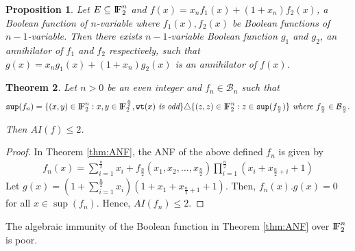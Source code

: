 \documentclass{article}[12pt]
\newtheorem{theorem}{Theorem}[section]
\newtheorem{proposition}[theorem]{Proposition}
\newcommand{\FF}{{\rm I\!F}}
\newcommand{\CB}{\mathcal{B}}
\newcommand{\wt}{\mathtt{wt}}
\newcommand{\spt}{\mathtt{sup}}
\begin{document}
\begin{proposition} 
	Let $E \subseteq \FF_2^n$ and  $f(x)= x_n f_1(x) +(1+x_n)f_2(x)$, a Boolean function of $n$-variable where $f_1 (x), f_2 (x)$ be Boolean functions of $n-1$-variable. Then there exists $n-1$-variable Boolean function $g_1$ and $g_2$, an annihilator of $f_1$ and $f_2$ respectively, such that $g(x)= x_n g_1(x) + (1+x_n) g_2 (x) $ is an annihilator of $f(x)$. 
\end{proposition}

\begin{theorem}
Let $n> 0$ be an even integer and $f_n \in  \CB_n$ such that
$$\spt(f_n) = \{(x,y) \in \FF_2^n : x,y \in \FF_2^{\frac{n}{2}}, \wt(x) \textit{ is odd}\} \triangle \{(z,z) \in \FF_2^n : z \in \spt(f_{\frac{n}{2}})\} \textit{ where } f_{\frac{n}{2}} \in \CB_{\frac{n}{2}}.$$

Then $AI(f) \leq 2$.
\end{theorem}
\begin{proof}
	In Theorem \ref{thm:ANF}, the ANF of the above defined $f_n$ is given by 
    \begin{align*}
    		\displaystyle{f_n(x)= \sum_{i=1}^{\frac{n}{2}} x_{i} + f_{\frac{n}{2}}(x_1,x_2,\ldots,x_\frac{n}{2})\prod_{i=1}^{\frac{n}{2}} (x_i + x_{\frac{n}{2} + i} + 1) } 
    \end{align*}	
Let $g(x)= (1+ \sum_{i=1}^{\frac{n}{2}} x_{i}) (1+ x_1 + x_{\frac{n}{2}+1} + 1)$. Then, $f_n(x).g(x)= 0 $ for all $x \in \sup(f_n)$. Hence, $AI(f_n) \leq 2$.
	
\end{proof}

The algebraic immunity of the Boolean function in Theorem \ref{thm:ANF} over $\FF_2^n$ is poor. \\
\end{document}
